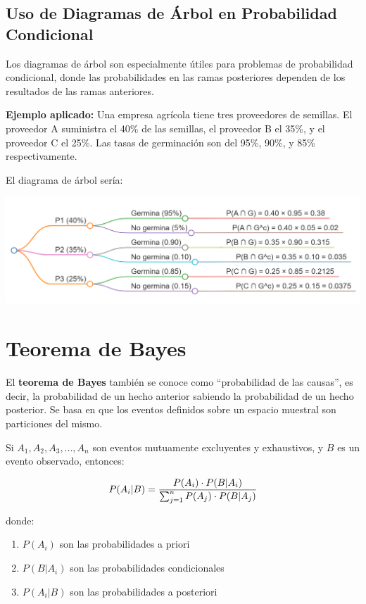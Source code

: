 \documentclass[
  spanish,
  letterpaper,
]{book}
\begin{document}
\subsection{Uso de Diagramas de Árbol en Probabilidad
Condicional}\label{uso-de-diagramas-de-uxe1rbol-en-probabilidad-condicional}

Los diagramas de árbol son especialmente útiles para problemas de
probabilidad condicional, donde las probabilidades en las ramas
posteriores dependen de los resultados de las ramas anteriores.

\textbf{Ejemplo aplicado:} Una empresa agrícola tiene tres proveedores
de semillas. El proveedor A suministra el 40\% de las semillas, el
proveedor B el 35\%, y el proveedor C el 25\%. Las tasas de germinación
son del 95\%, 90\%, y 85\% respectivamente.

El diagrama de árbol sería:

\begin{center}
\includegraphics[width=6.77083in,height=\textheight,keepaspectratio]{arbol_semillas.png}
\end{center}

\section{Teorema de Bayes}\label{teorema-de-bayes}

El \textbf{teorema de Bayes} también se conoce como ``probabilidad de
las causas'', es decir, la probabilidad de un hecho anterior sabiendo la
probabilidad de un hecho posterior. Se basa en que los eventos definidos
sobre un espacio muestral son particiones del mismo.

Si \(A_1, A_2, A_3, ..., A_n\)\hspace{0pt} son eventos mutuamente
excluyentes y exhaustivos, y \(B\) es un evento observado, entonces:

\[\LARGE P(A_i|B) = \frac{P(A_i) \cdot P(B|A_i)}{\sum_{j=1}^{n} P(A_j) \cdot P(B|A_j)}\]

donde:

\begin{enumerate}
\def\labelenumi{\arabic{enumi}.}
\item
  \(P(A_i)\) son las probabilidades a priori
\item
  \(P(B|A_i)\) son las probabilidades condicionales
\item
  \(P(A_i|B)\) son las probabilidades a posteriori
\end{enumerate}
\end{document}
